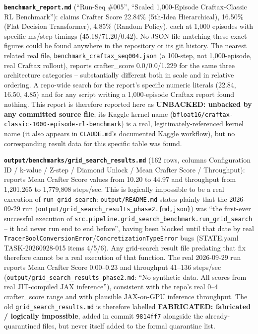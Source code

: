 \documentclass[11pt]{article}
\newcommand{\srcpath}[1]{\texttt{\small #1}}
\newcommand{\fabricated}[1]{\textcolor{red!60!black}{\textbf{FABRICATED: #1}}}
\newcommand{\unbacked}[1]{\textcolor{orange!70!black}{\textbf{UNBACKED: #1}}}
\begin{document}
\textbf{\srcpath{benchmark\_report.md}} (``Run-Seq \#005'', ``Scaled 1{,}000-Episode Craftax-Classic
RL Benchmark''): claims Crafter Score 22.84\% (5th-Idea Hierarchical), 16.50\% (Flat Decision
Transformer), 4.85\% (Random Policy), each at 1{,}000 episodes with specific ms/step timings
(45.18/71.20/0.42). No JSON file matching these exact figures could be found anywhere in the
repository or its git history. The nearest related real file,
\srcpath{benchmark\_craftax\_seq004.json} (a 100-step, not 1{,}000-episode, real Craftax rollout),
reports crafter\_score 0.0/0.0/1.229 for the same three architecture categories -- substantially
different both in scale and in relative ordering. A repo-wide search for the report's specific
numeric literals (22.84, 16.50, 4.85) and for any script writing a 1{,}000-episode Craftax report
found nothing. This report is therefore reported here as \unbacked{unbacked by any committed source
file}; its Kaggle kernel name (\texttt{bfloat16/craftax-classic-1000-episode-rl-benchmark}) is a
real, legitimately-referenced kernel name (it also appears in \texttt{CLAUDE.md}'s documented
Kaggle workflow), but no corresponding result data for this specific table was found.

\textbf{\srcpath{output/benchmarks/grid\_search\_results.md}} (162 rows, columns Configuration ID /
k-value / Z-step / Diamond Unlock / Mean Crafter Score / Throughput): reports Mean Crafter Score
values from 10.20 to 44.97 and throughput from 1{,}201{,}265 to 1{,}779{,}808 steps/sec. This is
logically impossible to be a real execution of \texttt{run\_grid\_search}: \srcpath{output/README.md}
states plainly that the 2026-09-29 run (\srcpath{output/grid\_search\_results\_phase2.\{md,json\}})
was ``the first-ever successful execution of \texttt{src.pipeline.grid\_search\_benchmark.run\_grid\_search}
-- it had never run end to end before'', having been blocked until that date by real
\texttt{TracerBoolConversionError}/\texttt{ConcretizationTypeError} bugs (STATE.yaml
TASK-20260928-015 items 4/5/6). Any grid-search result file predating that fix therefore cannot be
a real execution of that function. The real 2026-09-29 run reports Mean Crafter Score 0.00--0.23 and
throughput 41--136 steps/sec (\srcpath{output/grid\_search\_results\_phase2.md}: ``No synthetic
data. All scores from real JIT-compiled JAX inference''), consistent with the repo's real 0--4
crafter\_score range and with plausible JAX-on-GPU inference throughput. The old
\srcpath{grid\_search\_results.md} is therefore labelled \fabricated{fabricated / logically
impossible}, added in commit \texttt{9814ff7} alongside the already-quarantined files, but never
itself added to the formal quarantine list.
\end{document}
